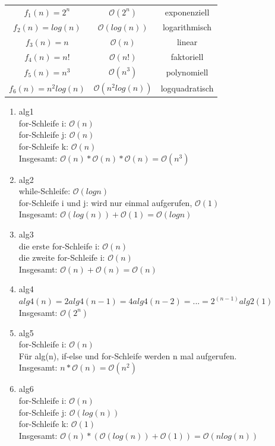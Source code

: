 \documentclass[12pt]{scrartcl}
\begin{document}
\begin{enumerate}
  \begin{center}
    \begin{tabular}{ |c|c|c| } 
     \hline
     $f_1(n) = 2^n$ & $\mathcal{O}(2^n)$ & exponenziell \\ 
     $f_2(n) = log(n)$ & $\mathcal{O}(log(n))$ & logarithmisch \\ 
     $f_3(n) = n$ & $\mathcal{O}(n)$ & linear \\ 
     $f_4(n) = n!$ & $\mathcal{O}(n!)$ & faktoriell \\ 
     $f_5(n) = n^3$ & $\mathcal{O}(n^3)$ & polynomiell \\ 
     $f_6(n) = n^2log(n)$ & $\mathcal{O}(n^2log(n))$ & logquadratisch \\ 
     \hline
    \end{tabular}
    \end{center}
\end{enumerate}

\begin{enumerate}
  \item alg1\\
    for-Schleife i: $\mathcal{O}(n)$\\
    for-Schleife j: $\mathcal{O}(n)$\\
    for-Schleife k: $\mathcal{O}(n)$\\
    Insgesamt: $\mathcal{O}(n)*\mathcal{O}(n)*\mathcal{O}(n) = \mathcal{O}(n^3)$
    \item alg2\\
    while-Schleife: $\mathcal{O}(log{}n)$\\
    for-Schleife i und j: wird nur einmal aufgerufen, $\mathcal{O}(1)$\\
    Insgesamt: $\mathcal{O}(log(n)) + \mathcal{O}(1) = \mathcal{O}(log{n})$
    \item alg3\\
    die erste for-Schleife i: $\mathcal{O}(n)$\\
    die zweite for-Schleife i: $\mathcal{O}(n)$\\
    Insgesamt: $\mathcal{O}(n) + \mathcal{O}(n) = \mathcal{O}(n)$
    \item alg4\\
    $alg4(n) = 2alg4(n-1) = 4alg4(n-2) = ... = 2^{(n-1)}alg2(1)$\\
    Insgesamt: $\mathcal{O}(2^n)$
    \item alg5\\
    for-Schleife i: $\mathcal{O}(n)$\\
    Für alg(n), if-else und for-Schleife werden n mal aufgerufen.\\
    Insgesamt: $n*\mathcal{O}(n) = \mathcal{O}(n^2)$
    \item alg6\\
    for-Schleife i: $\mathcal{O}(n)$\\
    for-Schleife j: $\mathcal{O}(log(n))$\\
    for-Schleife k: $\mathcal{O}(1)$\\
    Insgesamt: $\mathcal{O}(n)*(\mathcal{O}(log(n)) + \mathcal{O}(1)) = \mathcal{O}(nlog(n))$
\end{enumerate}
\end{document}
